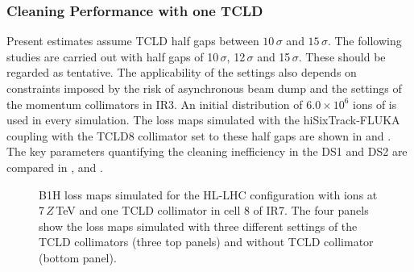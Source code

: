 \subsubsection{Cleaning Performance with one TCLD}


Present estimates assume TCLD half gaps between $10\,\sigma$ and $15\,\sigma$. The following studies are carried out with half gaps of 10$\,\sigma$, 12$\,\sigma$ and 15$\,\sigma$. These should be regarded as tentative. The applicability of the settings also depends on constraints imposed by the risk of asynchronous beam dump and the settings of the momentum collimators in IR3. An initial distribution of $6.0 \times 10^6$ ions of \lead is used in every simulation.  The loss maps simulated with the hiSixTrack-FLUKA coupling with the TCLD8 collimator set to these half gaps are shown in  and . The key parameters quantifying the cleaning inefficiency in the DS1 and DS2 are compared in ,  and .


\begin{figure}[p]
  \centering
  \caption{B1H loss maps simulated for the HL-LHC configuration with \lead ions at 7$\,Z\,$TeV and one TCLD collimator in cell 8 of IR7. The four panels show the loss maps simulated with three different settings of the TCLD collimators (three top panels) and without TCLD collimator (bottom panel).}  
  \label{pic:16091420}
  \end{figure}


